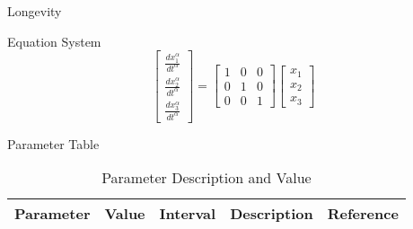 \begin{frame}[t]
\begin{columns}[t]
\begin{column}{\onecolwid}
\begin{alertblock}{Longevity}
\begin{alertblock}{Equation System}
\begin{equation}
\begin{bmatrix} 
	\frac{dx_{1}^{\alpha}}{dt^{\alpha}}\\ 
	\frac{dx_{2}^{\alpha}}{dt^{\alpha}}\\ 
	\frac{dx_{3}^{\alpha}}{dt^{\alpha}}
\end{bmatrix} = 
\begin{bmatrix}
1 & 0 & 0\\ 
0 & 1 & 0\\ 
0 & 0 & 1
\end{bmatrix} 
\begin{bmatrix} 
	x_{1}\\ 
	x_{2}\\ 
	x_{3}
\end{bmatrix}
\end{equation}


\end{alertblock}
\begin{alertblock}{Parameter Table}

\vspace{4pt}
\centering
\begin{table}[h]\footnotesize
	\caption{Parameter Description and Value}
	\begin{tabular}{rllp{2cm}l}
		\hline	
		Parameter & Value & Interval & Description & Reference \\
		\hline 
	\end{tabular}	
\end{table}



\end{alertblock}
\end{alertblock}
\end{column}
\end{columns}
\end{frame}
